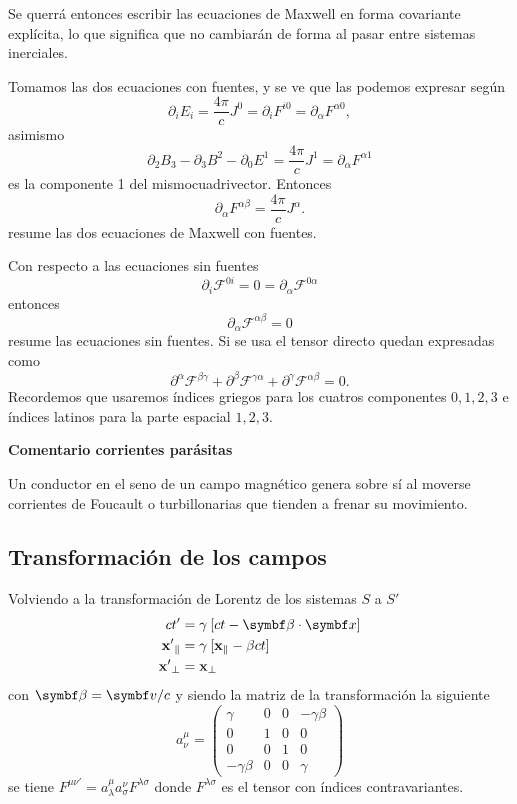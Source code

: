 \documentclass[10pt,oneside]{CBFT_book}
\begin{document}
Se querrá entonces escribir las ecuaciones de Maxwell en forma covariante explícita, lo
que significa que no cambiarán de forma al pasar entre sistemas inerciales.

Tomamos las dos ecuaciones con fuentes, y se ve que las podemos expresar según
\[
	\partial_i E_i = \frac{4 \pi }{c} J^0 = \partial_i F^{i0} = \partial_{\alpha} F^{\alpha 0},
\]
asimismo
\[
	\partial_2 B_{3} - \partial_3 B^{2} - \partial_0 E^{1} = 
	\frac{4 \pi }{c} J^1 = \partial_{\alpha} F^{\alpha 1}
\]
es la componente 1 del mismocuadrivector. Entonces
\[
	\partial_\alpha F^{\alpha\beta} =  \frac{4 \pi}{c} J^\alpha.
\]
resume las dos ecuaciones de Maxwell con fuentes.

Con respecto a las ecuaciones sin fuentes
\[
	\partial_i \mathcal{F}^{0i} =  0 =
	\partial_\alpha \mathcal{F}^{0\alpha} 
\]
entonces 
\[
	\partial_\alpha \mathcal{F}^{\alpha \beta}  = 0
\]
resume las ecuaciones sin fuentes.
Si se usa el tensor directo quedan expresadas como
\[
	\partial^\alpha \mathcal{F}^{\beta\gamma} +
	\partial^\beta \mathcal{F}^{\gamma\alpha} +
	\partial^\gamma \mathcal{F}^{\alpha\beta} = 0.
\]
Recordemos que usaremos índices griegos para los cuatros componentes $0,1,2,3$ e índices
latinos para la parte espacial $1,2,3$.

\begin{ejemplo}{\bf Comentario corrientes parásitas}

Un conductor en el seno de un campo magnético genera sobre sí al moverse corrientes
de Foucault o turbillonarias que tienden a frenar su movimiento.
 
\end{ejemplo}


\subsection{Transformación de los campos}

Volviendo a la transformación de Lorentz de los sistemas $S$ a $ S'$ 
\begin{align*}
	ct' &= \gamma \: [ ct - \pe{\beta}{x} ] \\
	\mathbf{x'}_\parallel &= \gamma \: [ \mathbf{x}_\parallel - {\beta}ct ] \\
	\mathbf{x'}_\perp &= \mathbf{x}_\perp
\end{align*}
con $\vb{\beta} = \vb{v}/c$ y siendo la matriz de la transformación la siguiente
\[
	a^{\mu}_{\nu} = 
	\begin{pmatrix}
	\gamma & 0 & 0 & -\gamma\beta \\
	0 & 1 & 0 & 0 \\
	0 & 0 & 1 & 0 \\
	-\gamma\beta & 0 & 0 & \gamma
	\end{pmatrix}
\]
se tiene $ F^{\mu\nu'} = a^{\mu}_{\lambda} a^{\nu}_{\sigma} F^{\lambda\sigma}$
donde $ F^{\lambda\sigma} $ es el tensor con índices contravariantes.
\end{document}
